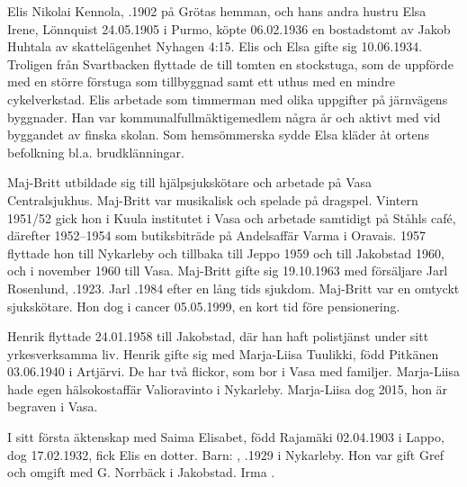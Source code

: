 %
Elis Nikolai Kennola, .1902 på Grötas hemman, och hans	andra hustru Elsa Irene, \textborn Lönnquist 24.05.1905 i Purmo, köpte	06.02.1936 en bostadstomt av Jakob Huhtala av skattelägenhet Nyhagen 4:15. Elis och Elsa gifte sig 10.06.1934. Troligen från Svartbacken flyttade de till tomten en stockstuga, som de uppförde med en större förstuga som tillbyggnad samt ett uthus med en mindre	cykelverkstad. Elis arbetade som timmerman med olika uppgifter på järnvägens byggnader. Han var kommunalfullmäktigemedlem några år och aktivt med vid byggandet av finska skolan. Som hemsömmerska sydde Elsa kläder åt ortens	befolkning bl.a. brudklänningar.
\begin{jhchildren}
  \item {}
  \item {}
\end{jhchildren}

Maj-Britt utbildade sig till hjälpsjukskötare och arbetade på Vasa Centralsjukhus. Maj-Britt var musikalisk och spelade på dragspel. Vintern 1951/52 gick hon i Kuula institutet i Vasa	 och arbetade samtidigt på Ståhls café, därefter 1952--1954 som butiksbiträde på Andelsaffär Varma i Oravais. 1957 flyttade hon till Nykarleby och tillbaka till Jeppo 1959 och till Jakobstad 1960, och i november 1960 till Vasa. Maj-Britt 	gifte sig 19.10.1963 med försäljare Jarl Rosenlund, .1923. Jarl .1984 efter en lång tids sjukdom. Maj-Britt var en omtyckt sjukskötare. Hon dog i cancer 05.05.1999, en kort tid före pensionering.

Henrik flyttade 24.01.1958 till Jakobstad, där han haft polistjänst under sitt yrkesverksamma liv. Henrik gifte sig med Marja-Liisa Tuulikki, född 	Pitkänen 03.06.1940 i Artjärvi. De har två flickor, som bor i Vasa med familjer. Marja-Liisa hade egen hälsokostaffär Valioravinto i Nykarleby. Marja-Liisa	dog 2015, hon är begraven i Vasa.

I sitt första äktenskap med Saima Elisabet, född Rajamäki 02.04.1903 i Lappo, dog 17.02.1932, fick Elis en dotter.
Barn: , .1929 i Nykarleby. Hon var gift Gref och omgift med G. Norrbäck i Jakobstad. Irma .

